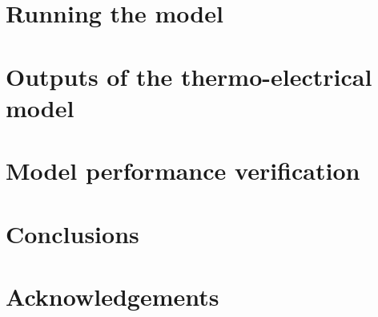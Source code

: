 \documentclass[preprint]{elsarticle/elsarticle}
\begin{document}
\section{Running the model}


\section{Outputs of the thermo-electrical model}


\section{Model performance verification}


\section{Conclusions}


\section{Acknowledgements}




\end{document}
